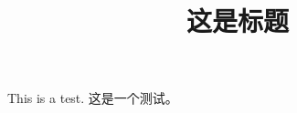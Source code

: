\documentclass[a4paper,12pt]{article}
\title{\sf\sanhao 这是标题}
\begin{document}
This is a test.
这是一个测试。
\end{document}
